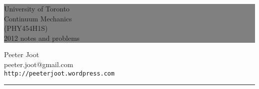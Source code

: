 \documentclass[openany]{memoir}
\newcommand{\HRule}[1]{\hfill \rule{0.2\linewidth}{#1}} %
\begin{document}
%
%

\thispagestyle{empty} %

\colorbox{grey}{
	\parbox[t]{1.0\linewidth}{
		\centering \fontsize{20pt}{30pt}\selectfont %
		\vspace*{0.7cm} %
		
		\hfill University of Toronto\\
		\hfill Continuum Mechanics\\
		\hfill (PHY454H1S)\\
		\hfill 2012 notes and problems\par
		
		\vspace*{0.7cm} %
	}
}

\vfill %

{\centering \large 
\hfill Peeter Joot\\
\hfill peeter.joot@gmail.com\\
\hfill \texttt{http://peeterjoot.wordpress.com}\\

\HRule{1pt}} %

\clearpage %

\end{document}
